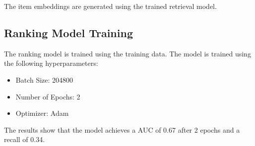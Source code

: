 The item embeddings are generated using the trained retrieval model.

\subsection{Ranking Model Training}

The ranking model is trained using the training data. The model is trained using the following hyperparameters:

\begin{itemize}
\item Batch Size: 204800
\item Number of Epochs: 2
\item Optimizer: Adam
\end{itemize}

The results show that the model achieves a AUC of 0.67 after 2 epochs and a recall of 0.34.
